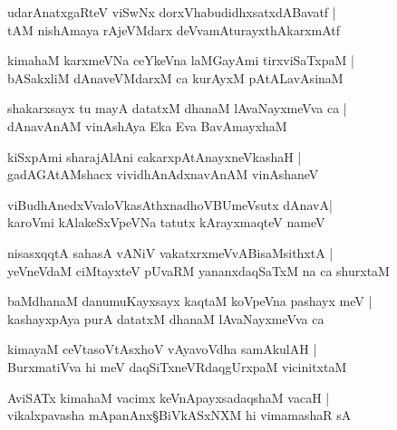 \begin{shloka}
udarAnatxgaRteV viSwNx dorxVhabudidhxsatxdABavatf |\\
tAM nishAmaya rAjeVMdarx deVvamAturayxthAkarxmAtf
\end{shloka}

\begin{shloka}
kimahaM karxmeVNa ceYkeVna laMGayAmi tirxviSaTxpaM |\\
bASakxliM dAnaveVMdarxM ca kurAyxM pAtALavAsinaM
\end{shloka}

\begin{shloka}
shakarxsayx tu mayA datatxM dhanaM lAvaNayxmeVva ca |\\
dAnavAnAM vinAshAya Eka Eva BavAmayxhaM 
\end{shloka}

\begin{shloka}
kiSxpAmi sharajAlAni cakarxpAtAnayxneVkashaH |\\
gadAGAtAMshacx vividhAnAdxnavAnAM vinAshaneV 
\end{shloka}

\begin{shloka}
viBudhAnedxVvaloVkasAthxnadhoVBUmeVsutx dAnavA\R |\\
karoVmi kAlakeSxVpeVNa tatutx kArayxmaqteV nameV
\end{shloka}

\begin{shloka}
nisasxqqtA sahasA vANiV vakatxrxmeVvABisaMsithxtA |\\
yeVneVdaM ciMtayxteV pUvaRM yananxdaqSaTxM na ca shurxtaM 
\end{shloka}

\begin{shloka}
baMdhanaM danumuKayxsayx kaqtaM koVpeVna pashayx meV |\\
kashayxpAya purA datatxM dhanaM lAvaNayxmeVva ca
\end{shloka}

\begin{shloka}
kimayaM ceVtasoVtAsxhoV vAyavoVdha samAkulAH |\\
BurxmatiVva hi meV daqSiTxneVRdaqgUrxpaM vicinitxtaM 
\end{shloka}

\begin{shloka}
AviSATx kimahaM vacimx keVnApayxsadaqshaM vacaH |\\
vikalxpavasha mApanAnx\S BiVkASxNXM hi vimamashaR sA
\end{shloka}


